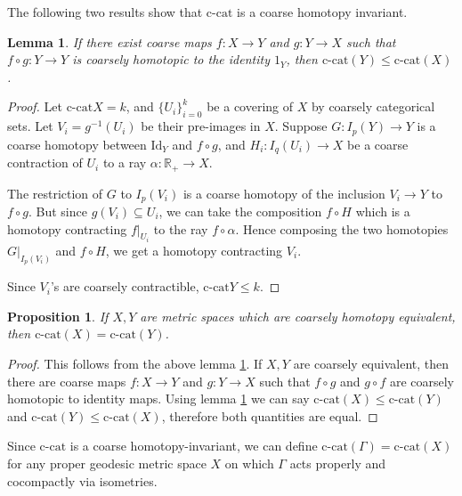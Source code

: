 \documentclass {amsart}
\newcommand {\ccat}     {\text{c-cat}}
\newcommand {\Id}       {\text{Id}}
\newcommand {\Rplus}    {\mathbb{R}_{+}}
\newtheorem   {lemma}       [theorem] {Lemma}
\newtheorem   {proposition} [theorem] {Proposition}
\theoremstyle {definition}
\begin{document}
The following two results show that \( \ccat \) is a coarse homotopy invariant.

\begin{lemma}
  \label{lem:ccat-dom}
    If there exist coarse maps \( f : X \to Y \) and \( g : Y \to X \) such that
    \( f \circ g : Y \to Y \) is coarsely homotopic to the identity \(
    1_Y \), then \( \ccat (Y) \leq \ccat (X) \).
\end{lemma}

\begin{proof}
    Let \( \ccat X = k \), and 
    \( \{ U_i \} _{i=0} ^{k} \) be a covering of \( X \) by coarsely categorical
    sets. Let \( V_i = g^{-1} (U_i) \) be their pre-images in \( X \).
    Suppose \( G : I_p(Y) \to Y \) is a coarse homotopy between \( \Id_Y \) and
    \( f \circ g \), and \( H_i : I_q (U_i) \to X \) be a coarse contraction of
    \( U_i \) to a ray \( \alpha : \Rplus \to X \).

    The restriction of \( G \) to \( I_p (V_i) \) is a coarse homotopy of the
    inclusion \( V_i \to Y \) to \( f \circ g \). But since \( g(V_i) \subseteq
    U_i \), we can take the composition \( f \circ H \) which is a homotopy
    contracting \( f|_{U_i} \) to the ray \( f \circ \alpha \). Hence composing
    the two homotopies \( G|_{I_p(V_i)} \) and \( f \circ H \), we get a
    homotopy contracting \( V_i \).

    Since \( V_i \)'s are coarsely contractible, \( \ccat Y \leq k \).
\end{proof}

\begin{proposition}
    If \( X, Y \) are metric spaces which are coarsely homotopy equivalent, then
    \( \ccat (X) = \ccat (Y) \).
\end{proposition}

\begin{proof}
  This follows from the above lemma \ref{lem:ccat-dom}. If \( X, Y\) are
  coarsely equivalent, then there are coarse maps \( f: X \to Y \) and \( g : Y
  \to X\) such that \( f \circ g \) and \( g \circ f \) are coarsely homotopic
  to identity maps. Using lemma \ref{lem:ccat-dom} we can say \( \ccat (X) \leq
  \ccat (Y)\) and \( \ccat(Y) \leq \ccat (X) \), therefore both quantities are
  equal.
\end{proof}

Since \( \ccat \) is a coarse homotopy-invariant, we can define \(
\ccat(\Gamma) = \ccat(X) \) for any proper geodesic metric space \( X \) on which 
\( \Gamma \) acts properly and cocompactly via isometries.
\end{document}
